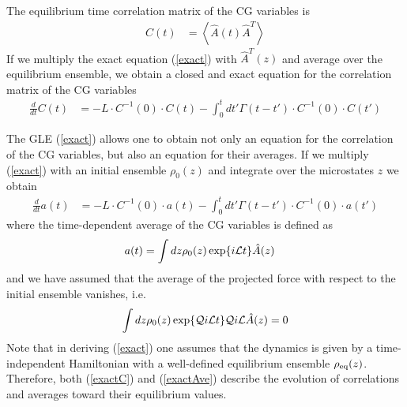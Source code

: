 \documentclass[b5paper,openright,10pt]{book}
\newcommand{\esc}{\!\cdot\!}
\newcommand{\llangle}{\left\langle}
\newcommand{\rrangle}{\right\rangle}
\begin{document}
The equilibrium time  correlation matrix of the CG variables is 
\begin{align}
  C(t)&=  \llangle \hat{A}(t)\hat{A}^T\rrangle
\end{align}
If we  multiply the  exact equation (\ref{exact})  with $\hat{A}^T(z)$
and  average over  the equilibrium  ensemble, we  obtain a  closed and
exact equation for the correlation matrix of the CG variables
\begin{align}
  \frac{d}{dt}C(t)&=-L\esc C^{-1}(0)\esc C(t)
-\int_0^tdt' \Gamma(t-t')\esc C^{-1}(0)\esc  C(t')
\label{exactC}
\end{align}

The GLE (\ref{exact}) allows  one to obtain
not only an equation for the correlation of the CG variables, but also
an equation for  their averages. If we multiply  (\ref{exact}) with an
initial ensemble $\rho_0(z)$ and integrate over the microstates $z$ we
obtain
\begin{align}
  \frac{d}{dt}a(t) &= -L\esc C^{-1}(0)\esc a(t)
-\int_0^tdt' \Gamma(t-t')\esc  C^{-1}(0)\esc a(t')
\label{exactAve}
\end{align}
where the time-dependent average of the CG variables is defined as
\begin{align}
  a(t)&=\int dz \rho_0(z) \exp\{i{\cal L}t\}\hat{A}(z)
\end{align}
and we have assumed that the average of the projected force with respect
to the initial ensemble vanishes, i.e.
\begin{align}
\int dz\rho_0(z)\exp\{{\cal Q}i{\cal L}t\} {\cal Q}i{\cal L}\hat{A}(z)=0
\label{F0}
\end{align}
 Note that in deriving (\ref{exact})
one  assumes  that  the  dynamics   is  given  by  a  time-independent
Hamiltonian  with  a   well-defined  equilibrium  ensemble  $\rho_{\rm
  eq}(z)$.   Therefore,   both  (\ref{exactC})   and  (\ref{exactAve})
describe  the evolution  of  correlations and  averages toward  their
equilibrium values.
\end{document}
